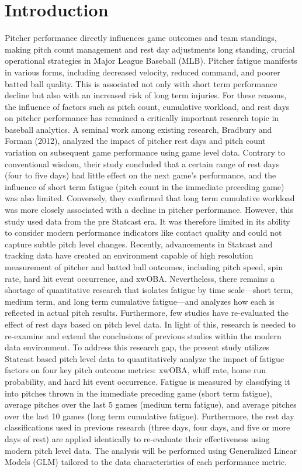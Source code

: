 \documentclass[12pt, letterpaper]{article}
\begin{document}
\section{Introduction}
  Pitcher performance directly influences game outcomes and team standings, making pitch count management and rest day adjustments long standing, crucial operational strategies in Major League Baseball (MLB). Pitcher fatigue manifests in various forms, including decreased velocity, reduced command, and poorer batted ball quality. This is associated not only with short term performance decline but also with an increased risk of long term injuries. For these reasons, the influence of factors such as pitch count, cumulative workload, and rest days on pitcher performance has remained a critically important research topic in baseball analytics.
A seminal work among existing research, Bradbury and Forman (2012), analyzed the impact of pitcher rest days and pitch count variation on subsequent game performance using game level data. Contrary to conventional wisdom, their study concluded that a certain range of rest days (four to five days) had little effect on the next game's performance, and the influence of short term fatigue (pitch count in the immediate preceding game) was also limited. Conversely, they confirmed that long term cumulative workload was more closely associated with a decline in pitcher performance. However, this study used data from the pre Statcast era. It was therefore limited in its ability to consider modern performance indicators like contact quality and could not capture subtle pitch level changes.
Recently, advancements in Statcast and tracking data have created an environment capable of high resolution measurement of pitcher and batted ball outcomes, including pitch speed, spin rate, hard hit event occurrence, and xwOBA. Nevertheless, there remains a shortage of quantitative research that isolates fatigue by time scale—short term, medium term, and long term cumulative fatigue—and analyzes how each is reflected in actual pitch results. Furthermore, few studies have re-evaluated the effect of rest days based on pitch level data. In light of this, research is needed to re-examine and extend the conclusions of previous studies within the modern data environment.
To address this research gap, the present study utilizes Statcast based pitch level data to quantitatively analyze the impact of fatigue factors on four key pitch outcome metrics: xwOBA, whiff rate, home run probability, and hard hit event occurrence. Fatigue is measured by classifying it into pitches thrown in the immediate preceding game (short term fatigue), average pitches over the last 5 games (medium term fatigue), and average pitches over the last 10 games (long term cumulative fatigue). Furthermore, the rest day classifications used in previous research (three days, four days, and five or more days of rest) are applied identically to re-evaluate their effectiveness using modern pitch level data. The analysis will be performed using Generalized Linear Models (GLM) tailored to the data characteristics of each performance metric.
\end{document}
